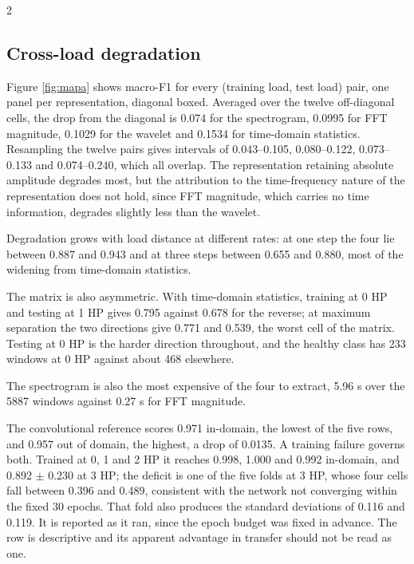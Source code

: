 \documentclass[12pt,twoside,titlepage]{ingenius}
\begin{document}
\begin{multicols}{2}
\subsection{Cross-load degradation}

Figure \ref{fig:mapa} shows macro-F1 for every (training load, test load) pair,
one panel per representation, diagonal boxed. Averaged over the twelve
off-diagonal cells, the drop from the diagonal is 0.074 for the spectrogram,
0.0995 for FFT magnitude, 0.1029 for the wavelet and 0.1534 for time-domain
statistics. Resampling the twelve pairs gives intervals of 0.043--0.105,
0.080--0.122, 0.073--0.133 and 0.074--0.240, which all overlap. The
representation retaining absolute amplitude degrades most, but the attribution
to the time-frequency nature of the representation does not hold, since FFT
magnitude, which carries no time information, degrades slightly less than the
wavelet.

Degradation grows with load distance at different rates: at one step the four
lie between 0.887 and 0.943 and at three steps between 0.655 and 0.880, most of
the widening from time-domain statistics.

The matrix is also asymmetric. With time-domain statistics, training at 0 HP and
testing at 1 HP gives 0.795 against 0.678 for the reverse; at maximum separation
the two directions give 0.771 and 0.539, the worst cell of the matrix. Testing
at 0 HP is the harder direction throughout, and the healthy class has 233
windows at 0 HP against about 468 elsewhere.

The spectrogram is also the most expensive of the four to extract, 5.96 s over
the 5887 windows against 0.27 s for FFT magnitude.

The convolutional reference scores 0.971 in-domain, the lowest of the five rows,
and 0.957 out of domain, the highest, a drop of 0.0135. A training failure
governs both. Trained at 0, 1 and 2 HP it reaches 0.998, 1.000 and 0.992
in-domain, and 0.892 $\pm$ 0.230 at 3 HP; the deficit is one of the five folds
at 3 HP, whose four cells fall between 0.396 and 0.489, consistent with the
network not converging within the fixed 30 epochs. That fold also produces the
standard deviations of 0.116 and 0.119. It is reported as it ran, since the
epoch budget was fixed in advance. The row is descriptive and its apparent
advantage in transfer should not be read as one.


\end{multicols}
\end{document}
